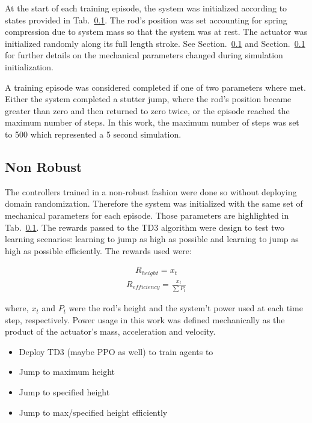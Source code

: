 \documentclass[letterpaper, 10 pt, conference]{ieeeconf}  %
\begin{document}
At the start of each training episode, the system was initialized according to states provided in Tab.~\ref{}. The rod's position was set accounting for spring compression due to system mass so that the system was at rest. The actuator was initialized randomly along its full length stroke. See Section.~\ref{} and Section.~\ref{} for further details on the mechanical parameters changed during simulation initialization.

A training episode was considered completed if one of two parameters where met. Either the system completed a stutter jump, where the rod's position became greater than zero and then returned to zero twice, or the episode reached the maximum number of steps. In this work, the maximum number of steps was set to 500 which represented a 5 second simulation.

\subsection{Non Robust}
The controllers trained in a non-robust fashion were done so without deploying domain randomization. Therefore the system was initialized with the same set of mechanical parameters for each episode. Those parameters are highlighted in Tab.~\ref{}. The rewards passed to the TD3 algorithm were design to test two learning scenarios: learning to jump as high as possible and learning to jump as high as possible efficiently. The rewards used were:

\begin{equation}
        \label{eq:rewardHeight}
        \begin{aligned}
                R_{height} = x_t
        \end{aligned}
\end{equation}
%
\begin{equation}
        \label{eq:rewardEfficiency}
        \begin{aligned}
                R_{efficiency} = \frac{x_t}{\sum P_t}
        \end{aligned}
\end{equation}

where, $x_t$ and $P_t$ were the rod's height and the system't power used at each time step, respectively. Power usage in this work was defined mechanically as the product of the actuator's mass, acceleration and velocity. 

\begin{itemize}
        \item Deploy TD3 (maybe PPO as well) to train agents to
        \item Jump to maximum height
        \item Jump to specified height
        \item Jump to max/specified height efficiently
\end{itemize}
\end{document}
